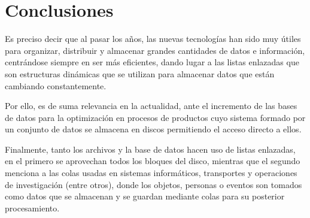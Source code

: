 \documentclass[10pt,journal]{IEEEtran}
\begin{document}
    \section{\textbf{Conclusiones}}
    Es preciso decir que al pasar los años, las nuevas tecnologías han sido muy útiles para organizar, distribuir y almacenar grandes cantidades de datos e información, centrándose siempre en ser más eficientes, dando lugar a las listas enlazadas que son estructuras dinámicas que se utilizan para almacenar datos que están cambiando constantemente.
    
    Por ello, es de suma relevancia en la actualidad, ante el incremento de las bases de datos para la optimización en procesos de productos cuyo sistema formado por un conjunto de datos se almacena en discos permitiendo el acceso directo a ellos.
    
    Finalmente, tanto los archivos y la base de datos hacen uso de listas enlazadas, en el primero se aprovechan todos los bloques del disco, mientras que el segundo menciona a las colas usadas en sistemas informáticos, transportes y operaciones de investigación (entre otros), donde los objetos, personas o eventos son tomados como datos que se almacenan y se guardan mediante colas para su posterior procesamiento.
    
\medskip

\end{document}
